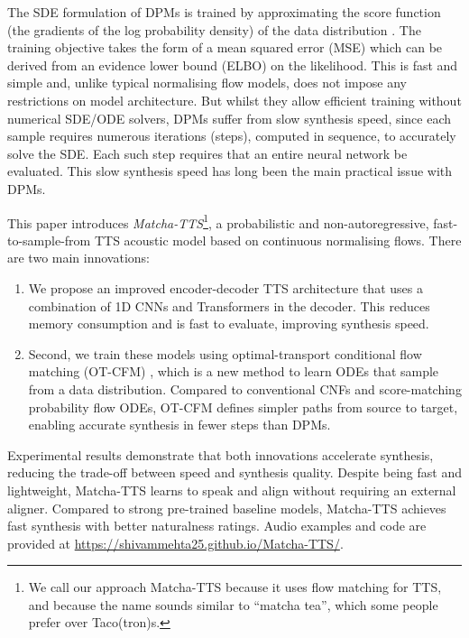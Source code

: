 \documentclass[british]{article}
\newcommand{\webpageurl}{https://shivammehta25.github.io/Matcha-TTS/}
\begin{document}
The SDE formulation of DPMs is trained by approximating the score function (the gradients of the log probability density) of the data distribution \cite{song2021score}.
The training objective takes the form of a mean squared error (MSE) which can be derived from an evidence lower bound (ELBO) on the likelihood.
This is fast and simple and, unlike typical normalising flow models, does not impose any restrictions on model architecture.
But whilst they allow efficient training without numerical SDE/ODE solvers, DPMs suffer from slow synthesis speed, since each sample requires numerous iterations (steps), computed in sequence, to accurately solve the SDE.
Each such step requires that an entire neural network be evaluated.
This slow synthesis speed has long been the main practical issue with DPMs.











This paper introduces \emph{Matcha-TTS}\footnote{We call our approach Matcha-TTS because it uses flow matching for TTS, and because the name sounds similar to ``matcha tea'', which some people prefer over Taco(tron)s.}, a probabilistic and non-autoregressive, fast-to-sample-from TTS acoustic model based on continuous normalising flows.
There are two main innovations:
\begin{enumerate}
\item We propose an improved encoder-decoder TTS architecture that uses a combination of 1D CNNs and Transformers in the decoder. This reduces memory consumption and is fast to evaluate, improving synthesis speed.
\item Second, we train these models using optimal-transport conditional flow matching (OT-CFM) \cite{lipman2023flow},
which is a new method to learn ODEs that sample from a data distribution.
Compared to conventional CNFs and score-matching probability flow ODEs, OT-CFM defines simpler paths from source to target, enabling accurate synthesis in fewer steps than DPMs.
\end{enumerate}
Experimental results demonstrate that both innovations accelerate synthesis, reducing the trade-off between speed and synthesis quality.
Despite being fast and lightweight, Matcha-TTS learns to speak and align without requiring an external aligner.
Compared to strong pre-trained baseline models, Matcha-TTS achieves fast synthesis with better naturalness ratings.
Audio examples and code are provided at \href{\webpageurl}{\webpageurl}.
\end{document}
